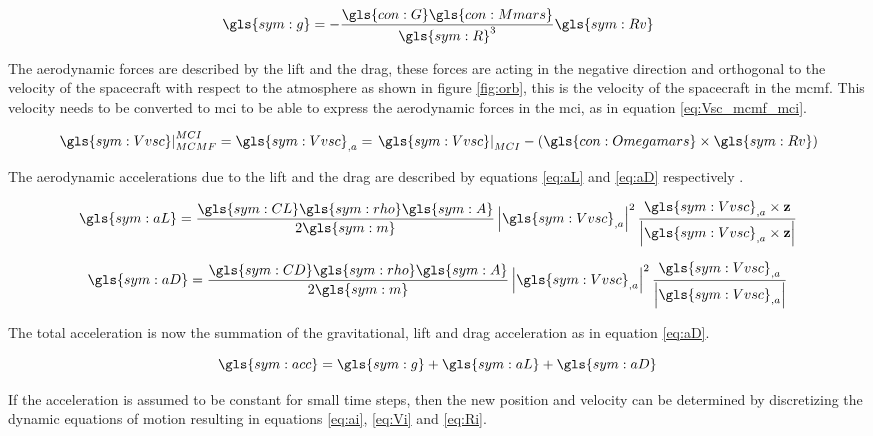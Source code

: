 \begin{equation} \label{eq:nG}
\gls{sym:g} = -\frac{\gls{con:G}\gls{con:Mmars}}
					{\gls{sym:R}^3}\gls{sym:Rv}
\end{equation}

The aerodynamic forces are described by the lift and the drag, these forces are acting in the negative direction and orthogonal to the velocity of the spacecraft with respect to the atmosphere as shown in figure \ref{fig:orb}, this is the velocity of the spacecraft in the \gls{mcmf}. This velocity needs to be converted to \gls{mci} to be able to express the aerodynamic forces in the \gls{mci}, as in equation \ref{eq:Vsc_mcmf_mci}.

\begin{equation} \label{eq:Vsc_mcmf_mci}
\left.\gls{sym:Vvsc}\right|_{MCMF}^{MCI} = \gls{sym:Vvsc}_{,a} = \left.\gls{sym:Vvsc}\right|_{MCI} - \left(\gls{con:Omegamars} \times \gls{sym:Rv} \right)
\end{equation}

The aerodynamic accelerations due to the lift and the drag are described by equations \ref{eq:aL} and \ref{eq:aD} respectively \cite{AndersonJr.2007}.

\begin{equation} \label{eq:aL}
\gls{sym:aL} = \frac{\gls{sym:CL}\gls{sym:rho}\gls{sym:A}}{2 \gls{sym:m}} 
				\left|\gls{sym:Vvsc}_{,a}\right|^2
				\frac{\gls{sym:Vvsc}_{,a} \times \mathbf{z}}
				{\left| \gls{sym:Vvsc}_{,a} \times \mathbf{z}\right|}
\end{equation}

\begin{equation} \label{eq:aD}
\gls{sym:aD} = \frac{\gls{sym:CD}\gls{sym:rho}\gls{sym:A}}{2 \gls{sym:m}}
				\left|\gls{sym:Vvsc}_{,a}\right|^2 \frac{\gls{sym:Vvsc}_{,a}}{\left|\gls{sym:Vvsc}_{,a}\right|}
\end{equation}

The total acceleration is now the summation of the gravitational, lift and drag acceleration as in equation \ref{eq:aD}.

\begin{equation} \label{eq:acc}
\gls{sym:acc} = \gls{sym:g} + \gls{sym:aL} + \gls{sym:aD}
\end{equation}

If the acceleration is assumed to be constant for small time steps, then the new position and velocity can be determined by discretizing the dynamic equations of motion resulting in equations \ref{eq:ai}, \ref{eq:Vi} and \ref{eq:Ri}.

